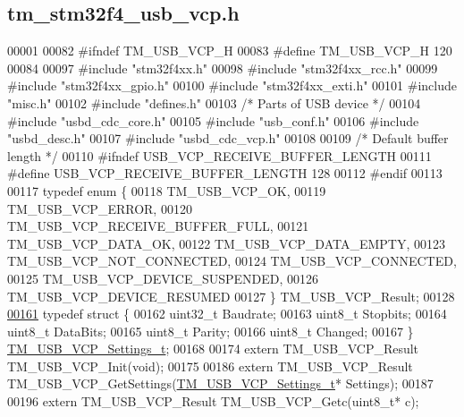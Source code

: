 \hypertarget{tm__stm32f4__usb__vcp_8h_source}{}\subsection{tm\+\_\+stm32f4\+\_\+usb\+\_\+vcp.\+h}

\begin{DoxyCode}
00001 
00082 \textcolor{preprocessor}{#ifndef TM\_USB\_VCP\_H}
00083 \textcolor{preprocessor}{#define TM\_USB\_VCP\_H    120}
00084 
00097 \textcolor{preprocessor}{#include "stm32f4xx.h"}
00098 \textcolor{preprocessor}{#include "stm32f4xx\_rcc.h"}
00099 \textcolor{preprocessor}{#include "stm32f4xx\_gpio.h"}
00100 \textcolor{preprocessor}{#include "stm32f4xx\_exti.h"}
00101 \textcolor{preprocessor}{#include "misc.h"}
00102 \textcolor{preprocessor}{#include "defines.h"}
00103 \textcolor{comment}{/* Parts of USB device */}
00104 \textcolor{preprocessor}{#include "usbd\_cdc\_core.h"}
00105 \textcolor{preprocessor}{#include "usb\_conf.h"}
00106 \textcolor{preprocessor}{#include "usbd\_desc.h"}
00107 \textcolor{preprocessor}{#include "usbd\_cdc\_vcp.h"}
00108 
00109 \textcolor{comment}{/* Default buffer length */}
00110 \textcolor{preprocessor}{#ifndef USB\_VCP\_RECEIVE\_BUFFER\_LENGTH}
00111 \textcolor{preprocessor}{#define USB\_VCP\_RECEIVE\_BUFFER\_LENGTH       128}
00112 \textcolor{preprocessor}{#endif}
00113 
00117 \textcolor{keyword}{typedef} \textcolor{keyword}{enum} \{
00118     TM\_USB\_VCP\_OK,
00119     TM\_USB\_VCP\_ERROR,
00120     TM\_USB\_VCP\_RECEIVE\_BUFFER\_FULL,
00121     TM\_USB\_VCP\_DATA\_OK,
00122     TM\_USB\_VCP\_DATA\_EMPTY,
00123     TM\_USB\_VCP\_NOT\_CONNECTED,
00124     TM\_USB\_VCP\_CONNECTED,
00125     TM\_USB\_VCP\_DEVICE\_SUSPENDED,
00126     TM\_USB\_VCP\_DEVICE\_RESUMED
00127 \} TM\_USB\_VCP\_Result;
00128 
\hypertarget{tm__stm32f4__usb__vcp_8h_source_l00161}{}\hyperlink{struct_t_m___u_s_b___v_c_p___settings__t}{00161} \textcolor{keyword}{typedef} \textcolor{keyword}{struct }\{
00162     uint32\_t Baudrate;
00163     uint8\_t Stopbits;
00164     uint8\_t DataBits;
00165     uint8\_t Parity;
00166     uint8\_t Changed;
00167 \} \hyperlink{struct_t_m___u_s_b___v_c_p___settings__t}{TM\_USB\_VCP\_Settings\_t};
00168 
00174 \textcolor{keyword}{extern} TM\_USB\_VCP\_Result TM\_USB\_VCP\_Init(\textcolor{keywordtype}{void});
00175 
00186 \textcolor{keyword}{extern} TM\_USB\_VCP\_Result TM\_USB\_VCP\_GetSettings(\hyperlink{struct_t_m___u_s_b___v_c_p___settings__t}{TM\_USB\_VCP\_Settings\_t}* Settings);
00187 
00196 \textcolor{keyword}{extern} TM\_USB\_VCP\_Result TM\_USB\_VCP\_Getc(uint8\_t* c);

\end{DoxyCode}
